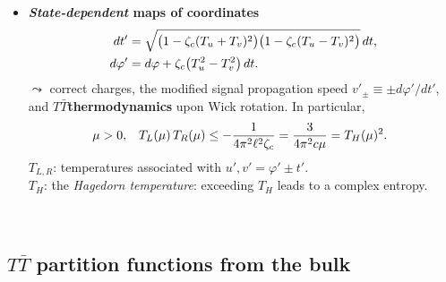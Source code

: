 \documentclass[10pt]{article}
\newcommand{\citations}[1]{{\footnotesize#1\par}}
\newcommand{\TTbar}{\texorpdfstring{\ensuremath{T\bar{T}}}{TTbar}\xspace}
\begin{document}
\begin{multicols}{3}
\begin{itemize}
\columnbreak

\vspace*{-8\baselineskip}

	\item \textbf{\textit{State-dependent} maps of \mbox{coordinates}}
	\begin{align}
		dt' &= \sqrt{ \big(1 - \zeta_c (T_u+T_v)^2 \big) \big(1 - \zeta_c (T_u-T_v)^2 \big) } \, dt, \notag \\
		 d\varphi' &= d\varphi + \zeta_c \big( T_u^2 - T_v^2 \big)\,dt.
	\label{eq:state_dependent_map}
	\end{align}
	$\leadsto$ correct charges, the modified signal propagation speed $v'_{\pm} \equiv \pm {d\varphi'}/{dt'}$, and \TTbar \textbf{thermodynamics} upon Wick rotation. In particular,
	\begin{equation*}
	\hspace{-.5em} \mu > 0,\ \ \,
		T_L(\mu)\,T_R(\mu) \le - \frac{1}{4\pi^2 \ell^2 \zeta_c} = \frac{3}{4\pi^2c\mu} = T_H(\mu)^2.
	\end{equation*}
	$T_{L,R}$: temperatures associated with $u',v' = \varphi' \pm t'$.\\
	$T_H$: the \textit{Hagedorn temperature}: exceeding $T_H$ leads to a complex entropy.

\begin{flushright}
\vspace{-.5\baselineskip}
\citations{
\textcite{Giveon:2017nie}\\
\textcite{Apolo:2019zai}
}
\vspace{-.8\baselineskip}
\end{flushright}

\end{itemize}

\subsection*{\TTbar partition functions from the bulk} \label{se:partitionfunction}


\end{multicols}
\end{document}
